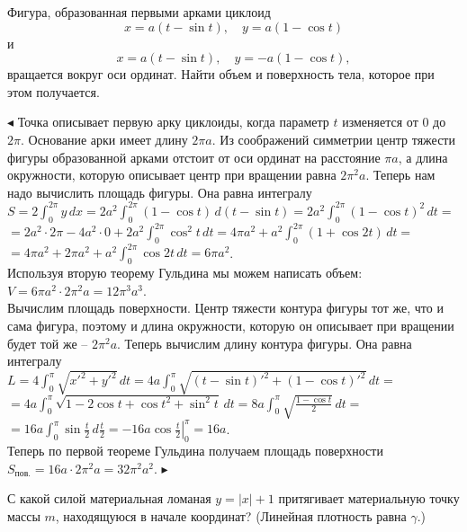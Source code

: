 \documentclass[a5paper,10pt]{article}
\begin{document}
\medskip
{} Фигура, образованная первыми арками циклоид
$$x=a(t-\sin t),\quad y=a(1-\cos t)$$
и
$$x=a(t-\sin t),\quad y=-a(1-\cos t),$$
вращается вокруг оси ординат. Найти объем и поверхность тела, которое при
этом получается.

\smallskip
\noindent $\blacktriangleleft$ Точка описывает первую арку циклоиды,
когда параметр $t$ изменяется от $0$ до $2\pi$. Основание арки имеет
длину $2\pi a$. Из соображений симметрии центр тяжести фигуры образованной
арками отстоит от оси ординат на расстояние $\pi a$, а длина окружности,
которую описывает центр при вращении равна $2\pi^2a$. Теперь нам надо
вычислить площадь фигуры. Она равна интегралу\\
$\displaystyle S=2\int_0^{2\pi}y\,dx=
2a^2\int_0^{2\pi}(1-\cos t)\,d(t-\sin t)=
2a^2\int_0^{2\pi}(1-\cos t)^2\,dt=$\\
$\displaystyle =2a^2\cdot2\pi-4a^2\cdot0+2a^2\int_0^{2\pi}\cos^2t\,dt=
4\pi a^2+a^2\int_0^{2\pi}(1+\cos2t)\,dt=$\\
$\displaystyle =4\pi a^2+2\pi a^2+a^2\int_0^{2\pi}\cos2t\,dt=6\pi a^2$.\\
Используя вторую теорему Гульдина мы можем написать объем:\\
$V=6\pi a^2\cdot 2\pi^2a=12\pi^3a^3$.\\

\smallskip
\noindent Вычислим площадь поверхности. Центр тяжести контура фигуры
тот же, что и сама фигура, поэтому и длина окружности, которую
он описывает при вращении будет той же -- $2\pi^2a$. Теперь
вычислим длину контура фигуры. Она равна интегралу\\
$\displaystyle L=4\int_0^{\pi}\sqrt{x'^2+y'^2}\,dt=
4a\int_0^{\pi}\sqrt{(t-\sin t)'^2+(1-\cos t)'^2}\,dt=$\\
$\displaystyle =4a\int_0^{\pi}\sqrt{1-2\cos t+\cos t^2+\sin^2t}\,dt=
8a\int_0^{\pi}\sqrt{\frac{1-\cos t}{2}}\,dt=$\\
$\displaystyle =16a\int_0^{\pi}\sin\frac t2\,d\frac t2=
-\left.16a\cos\frac t2\right|_0^{\pi}=16a$.\\
Теперь по первой теореме Гульдина получаем площадь поверхности\\
$S_{\mbox{пов.}}=16a\cdot 2\pi^2a=32\pi^2a^2$. $\blacktriangleright$

\medskip
{} С какой силой материальная ломаная $y=|x|+1$
притягивает материальную точку массы $m$, находящуюся в начале
координат? (Линейная плотность равна $\gamma$.)
\end{document}
